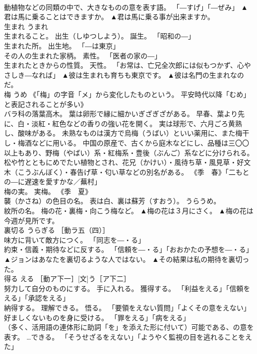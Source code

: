 \documentclass[8pt]{extreport}
\begin{document}
\begin{CJK}{UTF8}{min}
\\	動植物などの同類の中で、大きなものの意を表す語。 「―すげ」「―ぜみ」	▲君は馬に乗ることはできますか。 ▲君は馬に乗る事が出来ますか。
\\	生まれ	うまれ	
\\	生まれること。 出生（しゆつしよう）。 誕生。 「昭和の―」 
\\	生まれた所。 出生地。 「―は東京」 
\\	その人の生まれた家柄。 素性。 「医者の家の―」 
\\	生まれたときからの性質。 天性。 「お常は、亡兄全次郎には似もつかず、心やさしき―なれば」	▲彼は生まれも育ちも東京です。 ▲彼は名門の生まれなのだ。
\\	梅	うめ	《「梅」の字音「メ」から変化したものという。 平安時代以降「むめ」と表記されることが多い》 
\\	バラ科の落葉高木。 葉は卵形で縁に細かいぎざぎざがある。 早春、葉より先に、白・淡紅・紅色などの香りの強い花を開く。 実は球形で、六月ごろ黄熟し、酸味がある。 未熟なものは漢方で烏梅（うばい）といい薬用に、また梅干し・梅酒などに用いる。 中国の原産で、古くから庭木などにし、品種は三〇〇以上もあり、野梅（やばい）系・紅梅系・豊後（ぶんご）系などに分けられる。 松や竹とともにめでたい植物とされ、花兄（かけい）・風待ち草・風見草・好文木（こうぶんぼく）・春告げ草・匂い草などの別名がある。 《季　春》「二もとの―に遅速を愛すかな／蕪村」 
\\	梅の実。 実梅。 《季　夏》 
\\	襲（かさね）の色目の名。 表は白、裏は蘇芳（すおう）。 うらうめ。 
\\	紋所の名。 梅の花・裏梅・向こう梅など。	▲梅の花は３月にさく。 ▲梅の花は今週が見所です。
\\	裏切る	うらぎる	［動ラ五（四）］ 
\\	味方に背いて敵方につく。 「同志を―・る」 
\\	約束・信義・期待などに反する。 「信頼を―・る」「おおかたの予想を―・る」	▲ジョンはあなたを裏切るような人ではない。 ▲その結果は私の期待を裏切った。
\\	得る	える	［動ア下一］[文]う［ア下二］ 
\\	努力して自分のものにする。 手に入れる。 獲得する。 「利益をえる」「信頼をえる」「承認をえる」 
\\	納得する。 理解できる。 悟る。 「要領をえない質問」「よくその意をえない」 
\\	好ましくないものを身に受ける。 「罪をえる」「病をえる」 
\\	（多く、活用語の連体形に助詞「を」を添えた形に付いて）可能である、の意を表す。 …できる。 「そうせざるをえない」「ようやく監視の目を逃れることをえた」 

\end{CJK}
\end{document}
